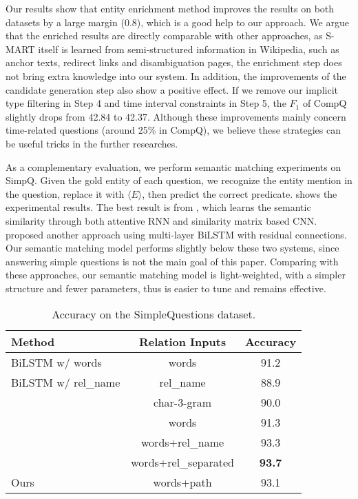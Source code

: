 Our results show that entity enrichment method
improves the results on both datasets by a large margin (0.8),
which is a good help to our approach.
We argue that the enriched results are directly comparable with other approaches,
as S-MART itself is learned from semi-structured information in Wikipedia,
such as anchor texts, redirect links and disambiguation pages,
the enrichment step does not bring extra knowledge into our system.
In addition, the improvements of the candidate generation step
also show a positive effect.
If we remove our implicit type filtering in Step 4 
and time interval constraints in Step 5,
the $F_1$ of CompQ slightly drops from 42.84 to 42.37.
Although these improvements mainly concern time-related questions (around 25\% in CompQ),
we believe these strategies can be useful tricks in the further researches.

As a complementary evaluation,
we perform semantic matching experiments on SimpQ.
Given the gold entity of each question,
we recognize the entity mention in the question, replace it with $\langle E \rangle$,
then predict the correct predicate.
 shows the experimental results.
The best result is from \citet{qu2018question}, which learns the semantic similarity 
through both attentive RNN and similarity matrix based CNN.
\citet{yu2017improved} proposed another approach
using multi-layer BiLSTM with residual connections.
Our semantic matching model performs slightly below these two systems,
since answering simple questions is not the main goal of this paper.
Comparing with these approaches, our semantic matching model is light-weighted,
with a simpler structure and fewer parameters,
thus is easier to tune and remains effective. 

\begin{table}[ht]
    \small
    \centering
    \begin{tabular} {l|c|c}
        \hline
        Method  &   Relation Inputs     & Accuracy   \\
        \hline
        BiLSTM w/ words             & words         & 91.2 \\
        BiLSTM w/ rel\_name         & rel\_name     & 88.9 \\
        \citet{yih2015semantic}     & char-3-gram   & 90.0 \\
        \citet{yin2016simple}       & words         & 91.3 \\
        \citet{yu2017improved}      & words+rel\_name    & 93.3 \\
        \citet{qu2018question}      & words+rel\_separated    & \textbf{93.7} \\
        \hline
        Ours                        & words+path    & 93.1 \\
        \hline
    \end{tabular}
    \caption{Accuracy on the SimpleQuestions dataset.}
    \label{tab:simpq}
\end{table}

